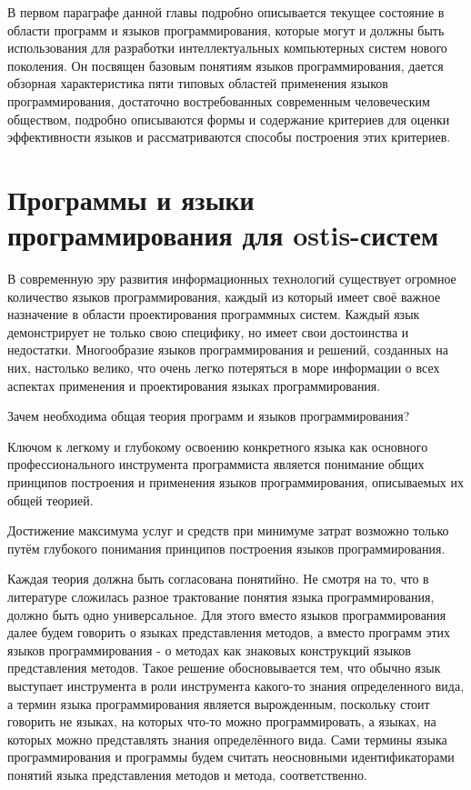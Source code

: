 В первом параграфе данной главы подробно описывается текущее состояние в области программ и языков программирования,
которые могут и должны быть использования для разработки интеллектуальных компьютерных систем нового поколения. Он
посвящен базовым понятиям языков программирования, дается обзорная характеристика пяти типовых областей применения
языков программирования, достаточно востребованных современным человеческим обществом, подробно описываются формы и
содержание критериев для оценки эффективности языков и рассматриваются способы построения этих критериев.


\section{Программы и языки программирования для ostis-систем}

В современную эру развития информационных технологий существует огромное количество языков программирования, каждый из
который имеет своё важное назначение в области проектирования программных систем. Каждый язык демонстрирует не только
свою специфику, но имеет свои достоинства и недостатки. Многообразие языков программирования и решений, созданных
на них, настолько велико, что очень легко потеряться в море информации о всех аспектах применения и проектирования
языках программирования.

Зачем необходима общая теория программ и языков программирования?
\begin{numerize}
    \item Ключом к легкому и глубокому освоению конкретного языка как основного профессионального инструмента
    программиста является понимание общих принципов построения и применения языков программирования, описываемых их
    общей теорией.
    \item Достижение максимума услуг и средств при минимуме затрат возможно только путём глубокого понимания принципов
    построения языков программирования.
\end{numerize}

Каждая теория должна быть согласована понятийно. Не смотря на то, что в литературе сложилась разное трактование понятия
языка программирования, должно быть одно универсальное. Для этого вместо языков программирования далее будем говорить о
языках представления методов, а вместо программ этих языков программирования - о методах как знаковых конструкций языков
представления методов. Такое решение обосновывается тем, что обычно язык выступает инструмента в роли инструмента
какого-то знания определенного вида, а термин языка программирования является вырожденным, поскольку стоит говорить не
языках, на которых что-то можно программировать, а языках, на которых можно представлять знания определённого вида.
Сами термины языка программирования и программы будем считать неосновными идентификаторами понятий языка представления
методов и метода, соответственно.

